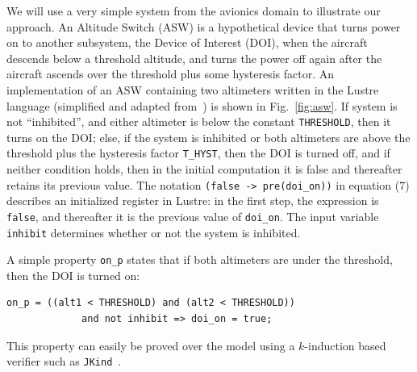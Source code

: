 We will use a very simple system from the avionics domain to illustrate our approach. An Altitude Switch (ASW) is a hypothetical device that turns power on to another subsystem, the Device of Interest (DOI), when the aircraft descends below a threshold altitude, and turns the power off again after the aircraft ascends over the threshold plus some hysteresis factor.  An implementation of an ASW containing two altimeters written in the Lustre language (simplified and adapted from~\cite{HCW02:ase-deviation}) is shown in Fig.~\ref{fig:asw}.  If system is not ``inhibited'', and either altimeter is below the constant {\small \texttt{THRESHOLD}}, then it turns on the DOI; else, if the system is inhibited or both altimeters are above the threshold plus the hysteresis factor {\small \texttt{T\_HYST}}, then the DOI is turned off, and if neither condition holds, then in the initial computation it is false and thereafter retains its previous value.  The notation {\small \texttt{(false -> pre(doi\_on))}} in equation (7) describes an initialized register in Lustre: in the first step, the expression is {\small \texttt{false}}, and thereafter it is the previous value of {\small \texttt{doi\_on}}. The input variable {\small\texttt{inhibit}} determines whether or not the system is inhibited.

A simple property {\small \texttt{on\_p}} states that if both altimeters are under the threshold, then the DOI is turned on:
{\smaller
\begin{verbatim}
on_p = ((alt1 < THRESHOLD) and (alt2 < THRESHOLD))
             and not inhibit => doi_on = true;
\end{verbatim}
}
\noindent This property can easily be proved over the model using a $k$-induction based verifier such as \texttt{JKind}~\cite{jkind}.  %

